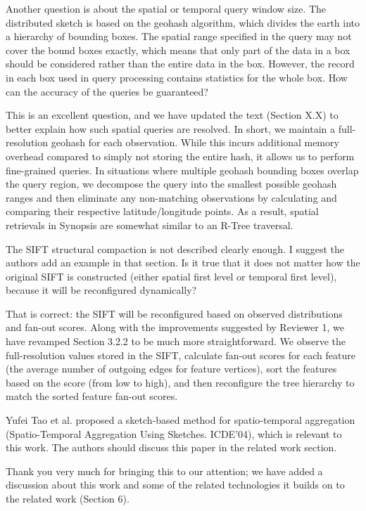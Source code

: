 \documentclass{article}
\begin{document}
Another question is about the spatial or temporal query window size. The
distributed sketch is based on the geohash algorithm, which divides the
earth into a hierarchy of bounding boxes. The spatial range specified in
the query may not cover the bound boxes exactly, which means that only
part of the data in a box should be considered rather than the entire
data in the box. However, the record in each box used in query
processing contains statistics for the whole box. How can the accuracy
of the queries be guaranteed?

\begin{tcolorbox}
This is an excellent question, and we have updated the text (Section
X.X) to better explain how such spatial queries are resolved. In short,
we maintain a full-resolution geohash for each observation. While this
incurs additional memory overhead compared to simply not storing the
entire hash, it allows us to perform fine-grained queries. In situations
where multiple geohash bounding boxes overlap the query region, we
decompose the query into the smallest possible geohash ranges and then
eliminate any non-matching observations by calculating and comparing
their respective latitude/longitude points. As a result, spatial
    retrievals in Synopsis are somewhat similar to an R-Tree \cite{guttman1984r}
traversal.
\end{tcolorbox}

The SIFT structural compaction is not described clearly enough. I
suggest the authors add an example in that section. Is it true that it
does not matter how the original SIFT is constructed (either spatial
first level or temporal first level), because it will be reconfigured
dynamically?

\begin{tcolorbox}
That is correct: the SIFT will be reconfigured based on observed
distributions and fan-out scores. Along with the improvements suggested
by Reviewer 1, we have revamped Section 3.2.2 to be much more
straightforward. We observe the full-resolution values stored in the
SIFT, calculate fan-out scores for each feature (the average number of
outgoing edges for feature vertices), sort the features based on the
score (from low to high), and then reconfigure the tree hierarchy to
match the sorted feature fan-out scores.
\end{tcolorbox}

Yufei Tao et al. proposed a sketch-based method for spatio-temporal
aggregation (Spatio-Temporal Aggregation Using Sketches. ICDE'04), which
is relevant to this work. The authors should discuss this paper in the
related work section.

\begin{tcolorbox}
Thank you very much for bringing this to our attention; we have added a
    discussion about this work \cite{tao2004spatio} and some of the related technologies it
    builds on \cite{papadias2002indexing,flajolet1985probabilistic} to the related work (Section 6). 
\end{tcolorbox}



\end{document}
